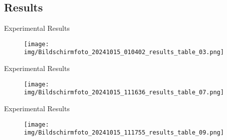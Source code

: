 \documentclass{beamer}
\begin{document}
\subsection{Results}

\begin{frame}{Experimental Results}

    \begin{figure}[h]
        \centering
        \vspace{-10pt} %
        \texttt{[image: img/Bildschirmfoto\_20241015\_010402\_results\_table\_03.png]}
        \vspace{-10pt}
        \label{fig:Figure_Ewald-MP_Algo_Structure}
    \end{figure}
    
\end{frame}

\begin{frame}{Experimental Results}

    \begin{figure}[h]
        \centering
        \vspace{-10pt} %
        \texttt{[image: img/Bildschirmfoto\_20241015\_111636\_results\_table\_07.png]}
        \vspace{-10pt}
        \label{fig:Figure_Ewald-MP_Algo_Structure}
    \end{figure}
    
\end{frame}

\begin{frame}{Experimental Results}

    \begin{figure}[h]
        \centering
        \vspace{-10pt} %
        \texttt{[image: img/Bildschirmfoto\_20241015\_111755\_results\_table\_09.png]}
        \vspace{-10pt}
        \label{fig:Figure_Ewald-MP_Algo_Structure}
    \end{figure}
    
\end{frame}
\end{document}
